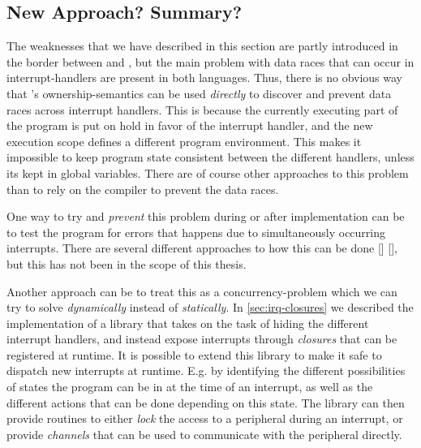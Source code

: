 \subsection{New Approach? Summary?}

The weaknesses that we have described in this section are partly introduced in the border between {\rust} and {\C}, but the main problem with data races that can occur in interrupt-handlers are present in both languages.
Thus, there is no obvious way that {\rust}'s ownership-semantics can be used \emph{directly} to discover and prevent data races across interrupt handlers.
This is because the currently executing part of the program is put on hold in favor of the interrupt handler, and the new execution scope defines a different program environment.
This makes it impossible to keep program state consistent between the different handlers, unless its kept in global variables.
There are of course other approaches to this problem than to rely on the compiler to prevent the data races.

One way to try and \emph{prevent} this problem during or after implementation can be to test the program for errors that happens due to simultaneously occurring interrupts.
There are several different approaches to how this can be done [] [], but this has not been in the scope of this thesis.

Another approach can be to treat this as a concurrency-problem which we can try to solve \emph{dynamically} instead of \emph{statically}.
In \autoref{sec:irq-closures} we described the implementation of a library that takes on the task of hiding the different interrupt handlers, and instead expose interrupts through \emph{closures} that can be registered at runtime.
It is possible to extend this library to make it safe to dispatch new interrupts at runtime.
E.g. by identifying the different possibilities of states the program can be in at the time of an interrupt, as well as the different actions that can be done depending on this state.
The library can then provide routines to either \emph{lock} the access to a peripheral during an interrupt, or provide \emph{channels} that can be used to communicate with the peripheral directly.